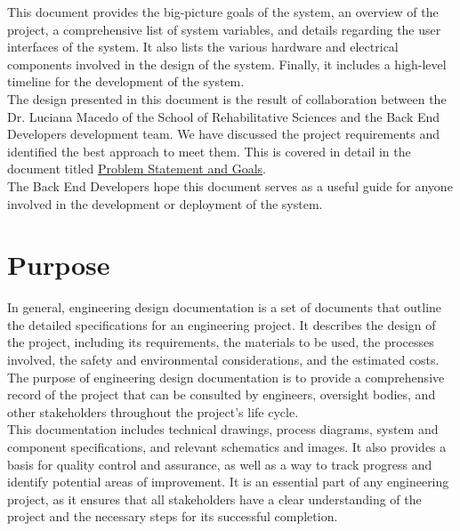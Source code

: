 \documentclass[12pt, titlepage]{article}
\begin{document}
This document provides the big-picture goals of the system, an overview of the project, a comprehensive list of system variables, and details regarding the user interfaces of the system. It also lists the various hardware and electrical components involved in the design of the system. Finally, it includes a high-level timeline for the development of the system. \\

The design presented in this document is the result of collaboration between the Dr. Luciana Macedo of the School of Rehabilitative Sciences and the Back End Developers development team. We have discussed the project requirements and identified the best approach to meet them. This is covered in detail in the document titled \href{https://github.com/zakerl/Capstone_Project/blob/desDoc_Labeeb/docs/ProblemStatementAndGoals/Team1_ProblemStatement\%20\%26\%20Goals.pdf}{Problem Statement and Goals}.\\

The Back End Developers hope this document serves as a useful guide for anyone involved in the development or deployment of the system. \\


\section{Purpose}

In general, engineering design documentation is a set of documents that outline the detailed specifications for an engineering project. It describes the design of the project, including its requirements, the materials to be used, the processes involved, the safety and environmental considerations, and the estimated costs. The purpose of engineering design documentation is to provide a comprehensive record of the project that can be consulted by engineers, oversight bodies, and other stakeholders throughout the project’s life cycle.\\

This documentation includes technical drawings, process diagrams, system and component specifications, and relevant schematics and images. It also provides a basis for quality control and assurance, as well as a way to track progress and identify potential areas of improvement. It is an essential part of any engineering project, as it ensures that all stakeholders have a clear understanding of the project and the necessary steps for its successful completion.\\
\end{document}
